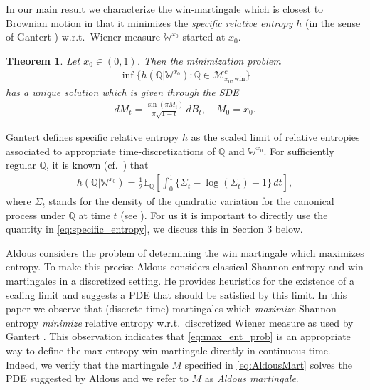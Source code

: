 \documentclass[reqno, a4paper]{amsart}
\newtheorem{theorem}{Theorem}
\theoremstyle{remark}
\newcommand{\E}{\mathbb{E}}
\newcommand{\Q}{\mathbb{Q}}
\newcommand{\1}{\mathbbm 1}
\numberwithin{equation}{section}
\numberwithin{theorem}{section}
\begin{document}
In our main result we characterize the win-martingale which is closest to Brownian motion in that it minimizes the \emph{specific relative entropy $h$}     (in the sense of Gantert \cite{Ga91}) w.r.t.\ Wiener measure $\mathbb{W}^{x_0}$ started at $x_0$. 
\begin{theorem}
Let $x_0\in (0,1)$. Then the minimization problem
\begin{align}\inf\{h(\mathbb{Q}| \mathbb{W}^{x_0}): \Q\in \mathcal M^c_{x_0, \text{win}} \} \label{eq:max_ent_prob}
\end{align}
has a unique solution which is given through the SDE
\begin{align}\label{eq:AldousMart} dM_t = \frac{\sin (\pi M_t )} {\pi\sqrt {1-t}}\, dB_t, \quad M_0=x_0.\end{align}
\end{theorem}
Gantert \cite{Ga91} defines specific relative entropy $h$ as the scaled limit of relative entropies associated to appropriate time-discretizations of $\Q$ and $\mathbb{W}^{x_0}$. For sufficiently regular $\Q$, it is known (cf.\ \cite{Ga91, BaUn22}) that  
\begin{align}\label{eq:specific_entropy} \textstyle h(\mathbb{Q}| \mathbb{W}^{x_0})= \frac{1}{2}\E_{\Q}\left[ \int_0^1\{\Sigma_t -\log(\Sigma_t) -1\}\,  dt \right ],\end{align}
where $\Sigma_t$ stands for the density of the quadratic variation for the canonical process under $\Q$  at time $t$ (see \cite{Ga91, Fo22a}). 
For us it is important  to directly use the quantity in \eqref{eq:specific_entropy}, we discuss this in Section 3 below.


Aldous \cite{Al22a, Al22b} considers the problem of determining the win martingale which maximizes entropy. To make this precise  Aldous considers classical Shannon entropy and win martingales in a discretized setting. He provides heuristics for the existence of a scaling limit and  suggests a PDE that should be satisfied by this limit. In this paper we observe that (discrete time)  martingales which  \emph{maximize} Shannon entropy \emph{minimize} relative entropy w.r.t.\ discretized Wiener measure as used by Gantert \cite{Ga91}.  %
This observation  indicates that \eqref{eq:max_ent_prob} is an appropriate way to define the max-entropy win-martingale directly in continuous time. Indeed, we   verify that the martingale $M$ specified in  \eqref{eq:AldousMart} solves the PDE suggested by Aldous and we refer to $M$ as \emph{Aldous martingale}. 
\end{document}
